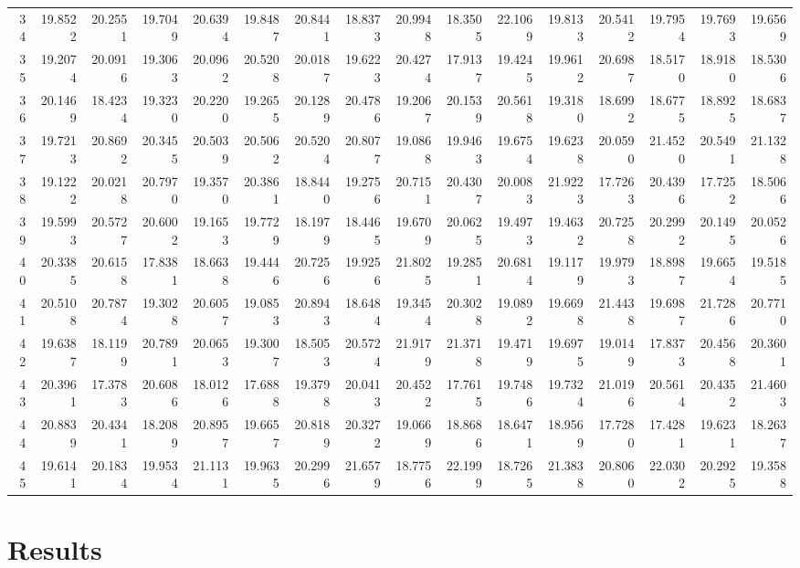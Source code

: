 \documentclass[12pt]{article}\usepackage[]{graphicx}\usepackage[]{color}
\begin{document}
\begin{landscape}
\begin{longtable}[t]{rrrrrrrrrrrrrrrr}
34 & 19.8522 & 20.2551 & 19.7049 & 20.6394 & 19.8487 & 20.8441 & 18.8373 & 20.9948 & 18.3505 & 22.1069 & 19.8133 & 20.5412 & 19.7954 & 19.7693 & 19.6569\\
35 & 19.2074 & 20.0916 & 19.3063 & 20.0962 & 20.5208 & 20.0187 & 19.6223 & 20.4274 & 17.9137 & 19.4245 & 19.9612 & 20.6987 & 18.5170 & 18.9180 & 18.5306\\
36 & 20.1469 & 18.4234 & 19.3230 & 20.2200 & 19.2655 & 20.1289 & 20.4786 & 19.2067 & 20.1539 & 20.5618 & 19.3180 & 18.6992 & 18.6775 & 18.8925 & 18.6837\\
37 & 19.7213 & 20.8692 & 20.3455 & 20.5039 & 20.5062 & 20.5204 & 20.8077 & 19.0868 & 19.9463 & 19.6754 & 19.6238 & 20.0590 & 21.4520 & 20.5491 & 21.1328\\
38 & 19.1222 & 20.0218 & 20.7970 & 19.3570 & 20.3861 & 18.8440 & 19.2756 & 20.7151 & 20.4307 & 20.0083 & 21.9223 & 17.7263 & 20.4396 & 17.7252 & 18.5066\\
39 & 19.5993 & 20.5727 & 20.6002 & 19.1653 & 19.7729 & 18.1979 & 18.4465 & 19.6709 & 20.0625 & 19.4973 & 19.4632 & 20.7258 & 20.2992 & 20.1495 & 20.0526\\
40 & 20.3385 & 20.6158 & 17.8381 & 18.6638 & 19.4446 & 20.7256 & 19.9256 & 21.8025 & 19.2851 & 20.6814 & 19.1179 & 19.9793 & 18.8987 & 19.6654 & 19.5185\\
41 & 20.5108 & 20.7874 & 19.3028 & 20.6057 & 19.0853 & 20.8943 & 18.6484 & 19.3454 & 20.3028 & 19.0892 & 19.6698 & 21.4438 & 19.6987 & 21.7286 & 20.7710\\
42 & 19.6387 & 18.1199 & 20.7891 & 20.0653 & 19.3007 & 18.5053 & 20.5724 & 21.9179 & 21.3718 & 19.4719 & 19.6975 & 19.0149 & 17.8373 & 20.4568 & 20.3601\\
43 & 20.3961 & 17.3783 & 20.6086 & 18.0126 & 17.6888 & 19.3798 & 20.0413 & 20.4522 & 17.7615 & 19.7486 & 19.7324 & 21.0196 & 20.5614 & 20.4352 & 21.4603\\
44 & 20.8839 & 20.4341 & 18.2089 & 20.8957 & 19.6657 & 20.8189 & 20.3272 & 19.0669 & 18.8686 & 18.6471 & 18.9569 & 17.7280 & 17.4281 & 19.6231 & 18.2637\\
45 & 19.6141 & 20.1834 & 19.9534 & 21.1131 & 19.9635 & 20.2996 & 21.6579 & 18.7756 & 22.1999 & 18.7265 & 21.3838 & 20.8060 & 22.0302 & 20.2925 & 19.3588\\*
\end{longtable}
\endgroup{}
\end{landscape}
\endgroup{}

\clearpage

\section{Results}\label{results}
\end{document}
